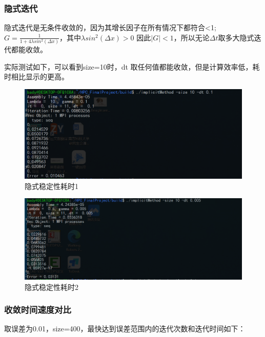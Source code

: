 \documentclass[10pt, a4paper]{article}
\begin{document}
\subsubsection{隐式迭代}
隐式迭代是无条件收敛的，因为其增长因子在所有情况下都符合<1;
$G=\frac{1}{1+4\lambda sin^2(\Delta x)}$，其中$\lambda sin^2(\Delta x)>0$
因此$|G|<1$，所以无论$\Delta t$取多大隐式迭代都能收敛。

实际测试如下，可以看到size=10时，dt 取任何值都能收敛，但是计算效率低，耗时相比显示的更高。



\begin{figure}[!h]
\centering
\includegraphics[scale=0.3]{img/隐式稳定性1.png}
\caption{隐式稳定性耗时1}
\label{fig:1}
\end{figure}

\begin{figure}[!h]
\centering
\includegraphics[scale=0.3]{img/隐式稳定性2.png}
\caption{隐式稳定性耗时2}
\label{fig:1}
\end{figure}

\subsubsection{收敛时间速度对比}
取误差为0.01，size=400，最快达到误差范围内的迭代次数和迭代时间如下：
\end{document}
